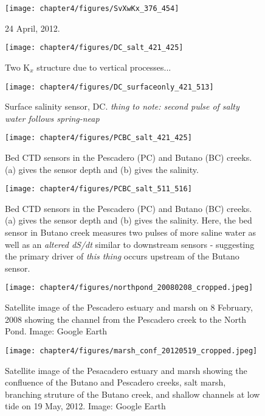 \begin{figure}
	\texttt{[image: chapter4/figures/SvXwKx\_376\_454]} 
\caption{24 April, 2012.} \label{fig:Kx424}
\end{figure}



\begin{figure}
	\texttt{[image: chapter4/figures/DC\_salt\_421\_425]}
	\caption{Two K$_x$ structure due to vertical processes...} \label{fig:SDCApr2012}
\end{figure}


\begin{figure}
	\texttt{[image: chapter4/figures/DC\_surfaceonly\_421\_513]}
	\caption{Surface salinity sensor, DC. \emph{thing to note: second pulse of salty water follows spring-neap}} \label{fig:SsurfLT}
\end{figure}


\begin{figure}
	\texttt{[image: chapter4/figures/PCBC\_salt\_421\_425]}
	\caption{Bed CTD sensors in the Pescadero (PC) and Butano (BC) creeks. (a) gives the sensor depth and (b) gives the salinity.} \label{fig:PCBC421:425}
\end{figure}



\begin{figure}
	\texttt{[image: chapter4/figures/PCBC\_salt\_511\_516]}
	\caption{Bed CTD sensors in the Pescadero (PC) and Butano (BC) creeks. (a) gives the sensor depth and (b) gives the salinity. Here, the bed sensor in Butano creek measures two pulses of more saline water as well as an \emph{altered dS/dt} similar to downstream sensors - suggesting the primary driver of \emph{this thing} occurs upstream of the Butano sensor.}  \label{fig:PCBC511:516}
\end{figure}



\begin{figure}
\centering
	\texttt{[image: chapter4/figures/northpond\_20080208\_cropped.jpeg]}
	\caption{Satellite image of the Pescadero estuary and marsh on 8 February, 2008 showing the channel from the Pescadero creek to the North Pond. Image: Google Earth} \label{fig:geNP}
\end{figure}


\begin{figure}
\centering

	\texttt{[image: chapter4/figures/marsh\_conf\_20120519\_cropped.jpeg]}
	\caption{Satellite image of the Pesacadero estuary and marsh showing the confluence of the Butano and Pescadero creeks, salt marsh, branching struture of the Butano creek, and shallow channels at low tide on 19 May, 2012. Image: Google Earth} \label{fig:geMarsh}
\end{figure}
